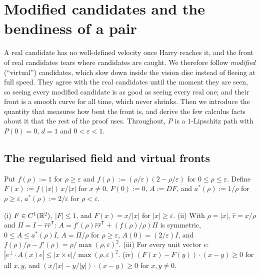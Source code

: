 ﻿%
\section{Modified candidates and the bendiness of a pair}\label{sec:virtual}

A real candidate has no well-defined velocity once Harry reaches it, and the front of real candidates tears where
candidates are caught. We therefore follow \emph{modified} (``virtual'') candidates, which slow down inside the vision
disc instead of fleeing at full speed. They agree with the real candidates until the moment they are seen, so seeing
every modified candidate is as good as seeing every real one; and their front is a smooth curve for all time, which never
shrinks. Then we introduce the quantity that measures how bent the front is, and derive the few calculus facts about it
that the rest of the proof uses. Throughout, $P$ is a $1$-Lipschitz path with $P(0)=0$, $d=1$ and $0<\varepsilon<1$.

\subsection{The regularised field and virtual fronts}

\begin{definition}\label{def:F}
Put $f(\rho):=1$ for $\rho\ge\varepsilon$ and $f(\rho):=(\rho/\varepsilon)(2-\rho/\varepsilon)$ for
$0\le\rho\le\varepsilon$. Define $F(x):=f(|x|)\,x/|x|$ for $x\ne0$, $F(0):=0$, $A:=DF$, and $a^*(\rho):=1/\rho$ for
$\rho\ge\varepsilon$, $a^*(\rho):=2/\varepsilon$ for $\rho<\varepsilon$.
\end{definition}

\begin{lemma}\label{lem:F}
\textup{(i)} $F\in C^1(\mathbb{R}^2)$, $|F|\le1$, and $F(x)=x/|x|$ for $|x|\ge\varepsilon$.
\textup{(ii)} With $\rho=|x|$, $\hat r=x/\rho$ and $\Pi=I-\hat r\hat r^{\mathsf T}$:
$A=f'(\rho)\hat r\hat r^{\mathsf T}+(f(\rho)/\rho)\Pi$ is symmetric, $0\le A\le a^*(\rho)I$, $A=\Pi/\rho$ for
$\rho\ge\varepsilon$, $A(0)=(2/\varepsilon)I$, and $f(\rho)/\rho-f'(\rho)=\rho/\max(\rho,\varepsilon)^2$.
\textup{(iii)} For every unit vector $e$: $|e^\perp\cdot A(x)e|\le|x\times e|/\max(\rho,\varepsilon)^2$.
\textup{(iv)} $(F(x)-F(y))\cdot(x-y)\ge0$ for all $x,y$, and $(x/|x|-y/|y|)\cdot(x-y)\ge0$ for $x,y\ne0$.
\end{lemma}

